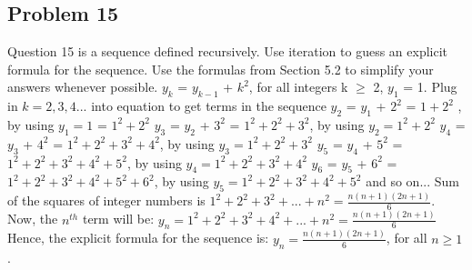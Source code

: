 \documentclass{article}
\begin{document}
	\subsection*{Problem 15}
	Question 15 is a sequence defined recursively. Use iteration
	to guess an explicit formula for the sequence. Use the formulas
	from Section 5.2 to simplify your answers whenever possible.
	\newline
	$y_{k}$ = $y_{k-1}$ + $k^{2}$, for all integers k $\geq$ 2,
	\newline
	$y_{1}$ = 1.
	\newline
	Plug in $k = 2,3,4...$ into equation to get terms in the sequence
	\newline
	$y_{2}$ = $y_{1}$ + $2^{2}$
	\newline
	= $1 + 2^{2}$ , by using $y_{1} = 1$
	\newline
	= $1^{2} + 2^{2}$
	\newline
	$y_{3}$ = $y_{2}$ + $3^{2}$
	\newline
	= $1^{2} + 2^{2} + 3^{2}$, by using $y_{2} = 1^{2} + 2^{2}$
	\newline
	$y_{4}$ = $y_{3}$ + $4^{2}$
	\newline
	= $1^{2} + 2^{2} + 3^{2} + 4^{2}$, by using $y_{3} = 1^{2} + 2^{2} + 3^{2}$
	\newline
	$y_{5}$ = $y_{4}$ + $5^{2}$
	\newline
	= $1^{2} + 2^{2} + 3^{2} + 4^{2} + 5^{2}$, by using $y_{4} = 1^{2} + 2^{2} + 3^{2} + 4^{2}$
	\newline
	$y_{6}$ = $y_{5}$ + $6^{2}$
	\newline
	= $1^{2} + 2^{2} + 3^{2} + 4^{2} + 5^{2} + 6^{2}$, by using $y_{5} = 1^{2} + 2^{2} + 3^{2} + 4^{2} + 5^{2}$
	\newline
	and so on...
	\newline
	Sum of the squares of integer numbers is $1^{2} + 2^{2} + 3^{2} + . . . + n^{2} = \frac{n(n+1)(2n+1)}{6}$.
	\newline
	Now, the $n^{th}$ term will be:
	\newline
	$y_{n} = 1^{2} + 2^{2} + 3^{2} + 4^{2} + . . . + n^{2} = \frac{n(n+1)(2n+1)}{6}$
	\newline
	Hence, the explicit formula for the sequence is: $y_{n} = \frac{n(n+1)(2n+1)}{6}$, for all $n \geq 1$.
	
\end{document}
